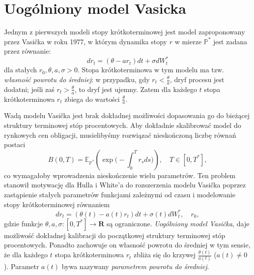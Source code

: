 \documentclass{mini}
\theoremstyle{mythstyle}
\begin{document}
	\section{Uogólniony model Vasicka}
	Jednym z pierwszych modeli stopy krótkoterminowej jest model zaproponowany przez Vasi\v{c}ka w roku 1977, w którym dynamika stopy $r$ w mierze $\mathbb{P}^*$ jest zadana przez równanie:
	\begin{equation}
	 dr_t =(\theta -ar_t)dt+\sigma dW_t^*
	\end{equation}
	dla stałych $r_0,\theta,a,\sigma >0$. Stopa krótkoterminowa w tym modelu ma tzw. \textit{własność powrotu do średniej}: w przypadku, gdy $r_t < \frac{\theta}{a}$, dryf procesu jest dodatni; jeśli zaś $r_t > \frac{\theta}{a}$, to dryf jest ujemny. Zatem dla każdego $t$ stopa krótkoterminowa $r_t$ zbiega do wartości $\frac{\theta}{a}$. 
	
	Wadą modelu Vasi\v{c}ka jest brak dokładnej możliwości dopasowania go do bieżącej struktury terminowej stóp procentowych. Aby dokładnie skalibrować model do rynkowych cen obligacji, musielibyśmy rozwiązać nieskończoną liczbę równań postaci
	\begin{equation}
	B(0,T) = \mathbb{E}_{\mathbb{P}^*}
	\left(\exp\bigg(-\int_0^T r_sds\bigg)\right), \quad T \in [0,T^*], 
	\end{equation}
	co wymagałoby wprowadzenia nieskończenie wielu parametrów. Ten problem stanowił motywację dla Hulla i White'a do rozszerzenia modelu Vasi\v{c}ka poprzez zastąpienie stałych parametrów funkcjami zależnymi od czasu i modelowanie stopy krótkoterminowej równaniem
	\begin{equation}
	dr_t =(\theta(t) -a(t)r_t)dt+\sigma(t) dW_t^*, \quad r_0,
	\end{equation}
	gdzie funkcje $\theta,a,\sigma: [0,T^*] \to \mathbf{R}$ są ograniczone. \textit{Uogólniony model Vasi\v{c}ka}, daje możliwość dokładnej kalibracji do początkowej struktury terminowej stóp procentowych. Ponadto zachowuje on własność powrotu do średniej w tym sensie, że dla każdego $t$ stopa krótkoterminowa $r_t$ zbliża się do krzywej $\frac{\theta(t)}{a(t)}$ ($a(t) \neq 0$). Parametr $a(t)$ bywa nazywany \textit{parametrem powrotu do średniej}.
\end{document}
